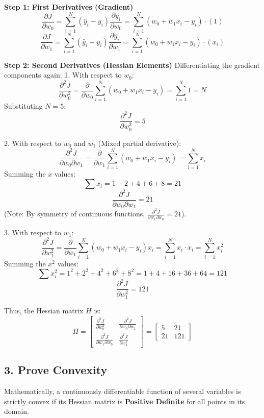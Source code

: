 \documentclass{article}
\begin{document}
\textbf{Step 1: First Derivatives (Gradient)}
$$ \frac{\partial J}{\partial w_0} = \sum_{i=1}^{N} (\hat{y}_i - y_i) \frac{\partial \hat{y}_i}{\partial w_0} = \sum_{i=1}^{N} (w_0 + w_1 x_i - y_i) \cdot (1) $$
$$ \frac{\partial J}{\partial w_1} = \sum_{i=1}^{N} (\hat{y}_i - y_i) \frac{\partial \hat{y}_i}{\partial w_1} = \sum_{i=1}^{N} (w_0 + w_1 x_i - y_i) \cdot (x_i) $$

\textbf{Step 2: Second Derivatives (Hessian Elements)}
Differentiating the gradient components again:
1. With respect to $w_0$:
$$ \frac{\partial^2 J}{\partial w_0^2} = \frac{\partial}{\partial w_0} \sum_{i=1}^{N} (w_0 + w_1 x_i - y_i) = \sum_{i=1}^{N} 1 = N $$
Substituting $N=5$:
$$ \frac{\partial^2 J}{\partial w_0^2} = 5 $$

2. With respect to $w_0$ and $w_1$ (Mixed partial derivative):
$$ \frac{\partial^2 J}{\partial w_0 \partial w_1} = \frac{\partial}{\partial w_1} \sum_{i=1}^{N} (w_0 + w_1 x_i - y_i) = \sum_{i=1}^{N} x_i $$
Summing the $x$ values:
$$ \sum x_i = 1 + 2 + 4 + 6 + 8 = 21 $$
$$ \frac{\partial^2 J}{\partial w_0 \partial w_1} = 21 $$
(Note: By symmetry of continuous functions, $\frac{\partial^2 J}{\partial w_1 \partial w_0} = 21$).

3. With respect to $w_1$:
$$ \frac{\partial^2 J}{\partial w_1^2} = \frac{\partial}{\partial w_1} \sum_{i=1}^{N} (w_0 + w_1 x_i - y_i) x_i = \sum_{i=1}^{N} x_i \cdot x_i = \sum_{i=1}^{N} x_i^2 $$
Summing the $x^2$ values:
$$ \sum x_i^2 = 1^2 + 2^2 + 4^2 + 6^2 + 8^2 = 1 + 4 + 16 + 36 + 64 = 121 $$
$$ \frac{\partial^2 J}{\partial w_1^2} = 121 $$

Thus, the Hessian matrix $H$ is:
$$
H = \begin{bmatrix}
\frac{\partial^2 J}{\partial w_0^2} & \frac{\partial^2 J}{\partial w_0 \partial w_1} \\
\frac{\partial^2 J}{\partial w_1 \partial w_0} & \frac{\partial^2 J}{\partial w_1^2}
\end{bmatrix} = \begin{bmatrix}
5 & 21 \\
21 & 121
\end{bmatrix}
$$

\subsection*{3. Prove Convexity}
Mathematically, a continuously differentiable function of several variables is strictly convex if its Hessian matrix is \textbf{Positive Definite} for all points in its domain.
\end{document}

